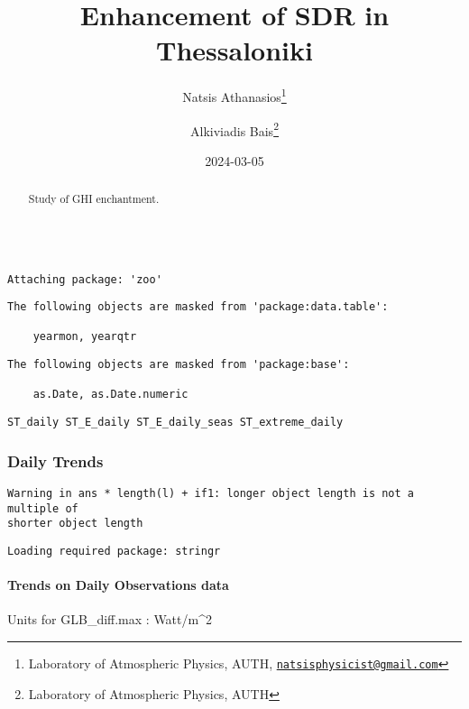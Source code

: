 \documentclass[
  10pt,
  a4paper,oneside]{article}
\title{Enhancement of SDR in Thessaloniki}
\author{Natsis Athanasios\footnote{Laboratory of Atmospheric Physics, AUTH, \href{mailto:natsisphysicist@gmail.com}{\nolinkurl{natsisphysicist@gmail.com}}} \and Alkiviadis Bais\footnote{Laboratory of Atmospheric Physics, AUTH}}
\date{2024-03-05}
\begin{document}
\maketitle
\begin{abstract}
Study of GHI enchantment.
\end{abstract}

{
\hypersetup{linkcolor=}
\setcounter{tocdepth}{4}
\tableofcontents
}
\begin{verbatim}

Attaching package: 'zoo'
\end{verbatim}

\begin{verbatim}
The following objects are masked from 'package:data.table':

    yearmon, yearqtr
\end{verbatim}

\begin{verbatim}
The following objects are masked from 'package:base':

    as.Date, as.Date.numeric
\end{verbatim}

\begin{verbatim}
ST_daily ST_E_daily ST_E_daily_seas ST_extreme_daily
\end{verbatim}

\newpage
\FloatBarrier

\hypertarget{daily-trends}{%
\subsubsection{Daily Trends}\label{daily-trends}}

\begin{verbatim}
Warning in ans * length(l) + if1: longer object length is not a multiple of
shorter object length
\end{verbatim}

\newpage

\begin{verbatim}
Loading required package: stringr
\end{verbatim}

\hypertarget{trends-on-daily-observations-data}{%
\paragraph{Trends on Daily Observations data}\label{trends-on-daily-observations-data}}

Units for GLB\_diff.max : Watt/m\^{}2
\end{document}
